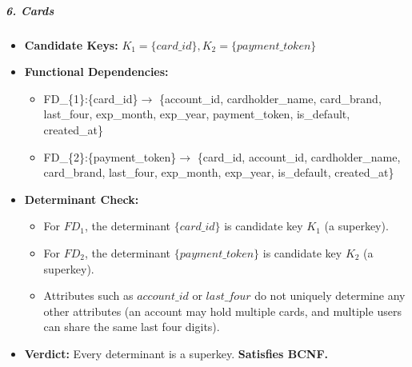 \subparagraph{\texorpdfstring{\textbf{6. Cards}}{6. Cards}}\label{cards}

\begin{itemize}
\item
  \textbf{Candidate Keys:} \(K_{1} = \{ card\_\allowbreak{} id\},K_{2} = \{ payment\_\allowbreak{} token\}\)
\item
  \textbf{Functional Dependencies:}

  \begin{itemize}
  \item
    \begin{minipage}[t]{.88\linewidth}\raggedright\small FD\_\allowbreak{}\{1\}:\{card\_\allowbreak{}id\}\(\rightarrow\) \{account\_\allowbreak{}id,\allowbreak{} cardholder\_\allowbreak{}name,\allowbreak{} card\_\allowbreak{}brand,\allowbreak{} last\_\allowbreak{}four,\allowbreak{} exp\_\allowbreak{}month,\allowbreak{} exp\_\allowbreak{}year,\allowbreak{} payment\_\allowbreak{}token,\allowbreak{} is\_\allowbreak{}default,\allowbreak{} created\_\allowbreak{}at\}\end{minipage}
  \item
    \begin{minipage}[t]{.88\linewidth}\raggedright\small FD\_\allowbreak{}\{2\}:\{payment\_\allowbreak{}token\}\(\rightarrow\) \{card\_\allowbreak{}id,\allowbreak{} account\_\allowbreak{}id,\allowbreak{} cardholder\_\allowbreak{}name,\allowbreak{} card\_\allowbreak{}brand,\allowbreak{} last\_\allowbreak{}four,\allowbreak{} exp\_\allowbreak{}month,\allowbreak{} exp\_\allowbreak{}year,\allowbreak{} is\_\allowbreak{}default,\allowbreak{} created\_\allowbreak{}at\}\end{minipage}
  \end{itemize}
\item
  \textbf{Determinant Check:}

  \begin{itemize}
  \item
    For \(FD_{1}\), the determinant \(\{ card\_\allowbreak{} id\}\) is candidate key \(K_{1}\) (a superkey).
  \item
    For \(FD_{2}\), the determinant \(\{ payment\_\allowbreak{} token\}\) is candidate key \(K_{2}\) (a superkey).
  \item
    Attributes such as \(account\_\allowbreak{} id\) or \(last\_\allowbreak{} four\) do not uniquely determine any other attributes (an account may hold multiple cards, and multiple users can share the same last four digits).
  \end{itemize}
\item
  \textbf{Verdict:} Every determinant is a superkey. \textbf{Satisfies BCNF.}
\end{itemize}

